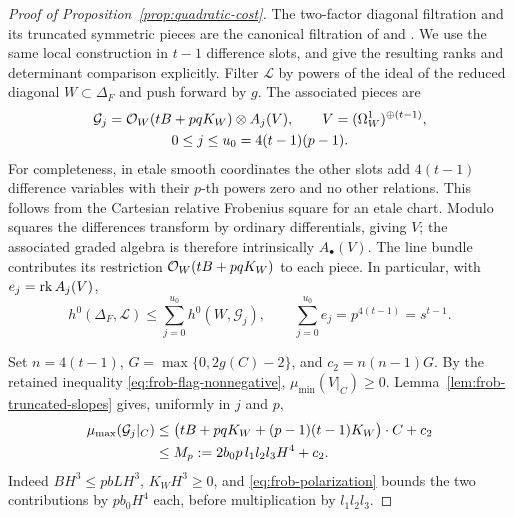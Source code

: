 \begin{proof}[Proof of Proposition~\ref{prop:quadratic-cost}]
The two-factor diagonal filtration and its truncated symmetric pieces
are the canonical filtration of
\cite[Theorem~3.7]{Sun2008} and
\cite[Definition~3.1, Remark~3.2, and Corollary~3.5]{KitadaiSumihiro2008}.
We use the same local construction in $t-1$ difference slots, and give
the resulting ranks and determinant comparison explicitly.
Filter $\mathcal L$ by powers of the ideal of the reduced diagonal
$W\subset\Delta_F$ and push forward by $g$.  The associated pieces are
\begin{equation}\label{eq:frob-diagonal-graded}
 \begin{gathered}
 \mathcal G_j=\mathcal O_W(tB+pqK_W)\otimes A_j(V),
 \qquad V=(\Omega_W^1)^{\oplus(t-1)},\\
 0\le j\le u_0=4(t-1)(p-1).
 \end{gathered}
\end{equation}
For completeness, in etale smooth coordinates the other slots add
$4(t-1)$ difference variables with their $p$-th powers zero and no
other relations.  This follows from the Cartesian relative Frobenius
square for an etale chart.  Modulo squares the differences transform
by ordinary differentials, giving $V$; the associated graded algebra
is therefore intrinsically $A_\bullet(V)$.  The line bundle contributes
its restriction $\mathcal O_W(tB+pqK_W)$ to each piece.  In particular, with
$e_j=\operatorname{rk} A_j(V)$,
\begin{equation}\label{eq:frob-diagonal-section-sum}
 h^0(\Delta_F,\mathcal L)\le\sum_{j=0}^{u_0}h^0(W,\mathcal G_j),
 \qquad \sum_{j=0}^{u_0}e_j=p^{4(t-1)}=s^{t-1}.
\end{equation}

Set $n=4(t-1)$, $G=\max\{0,2g(C)-2\}$, and $c_2=n(n-1)G$.
By the retained inequality \eqref{eq:frob-flag-nonnegative},
$\mu_{\min}(V|_C)\ge0$.  Lemma~\ref{lem:frob-truncated-slopes} gives,
uniformly in $j$ and $p$,
\begin{align}
 \mu_{\max}(\mathcal G_j|_C)
 &\le
 \bigl(tB+pqK_W+(p-1)(t-1)K_W\bigr)\cdot C+c_2\notag\\
 &\le M_p:=2b_0p\,l_1l_2l_3H^4+c_2.
 \label{eq:frob-Mp}
\end{align}
Indeed $BH^3\le pbLH^3$, $K_WH^3\ge0$, and
\eqref{eq:frob-polarization} bounds the two contributions by
$pb_0H^4$ each, before multiplication by $l_1l_2l_3$.


\end{proof}
